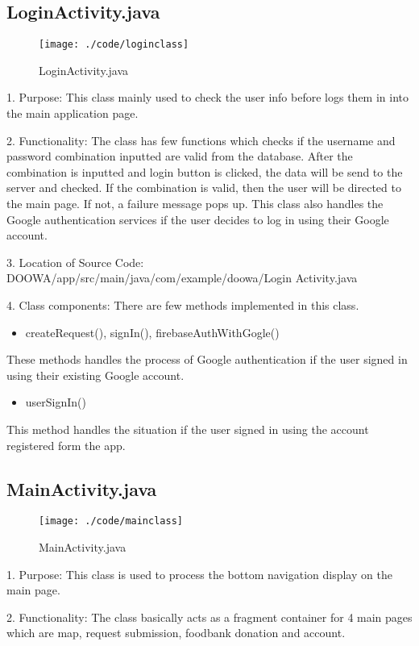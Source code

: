 \documentclass[conference]{IEEEtran}
\begin{document}
\subsection{LoginActivity.java}
\begin{figure}[h!]
\texttt{[image: ./code/loginclass]}
\centering
\caption{LoginActivity.java}
\end{figure}
1. Purpose: This class mainly used to check the user info before logs them in into the main application page.\break
\par 2. Functionality: The class has few functions which checks if the username and password combination inputted are valid from the database. After the combination is inputted and login button is clicked, the data will be send to the server and checked. If the combination is valid, then the user will be directed to the main page. If not, a failure message pops up. This class also handles the Google authentication services if the user decides to log in using their Google account.\break

3. Location of Source Code: DOOWA/app/src/main/java/com/example/doowa/Login Activity.java\break

4. Class components: There are few methods implemented in this class.
\begin{itemize}
\item createRequest(), signIn(), firebaseAuthWithGogle()
\end{itemize}
These methods handles the process of Google authentication if the user signed in using their existing Google account.
\begin{itemize}
\item userSignIn()
\end{itemize}
This method handles the situation if the user signed in using the account registered form the app.
\break
\subsection{MainActivity.java}
\begin{figure}[h!]
\texttt{[image: ./code/mainclass]}
\centering
\caption{MainActivity.java}
\end{figure}
1. Purpose: This class is used to process the bottom navigation display on the main page.\break

\par 2. Functionality: The class basically acts as a fragment container for 4 main pages which are map, request submission, foodbank donation and account.  \break
\end{document}
